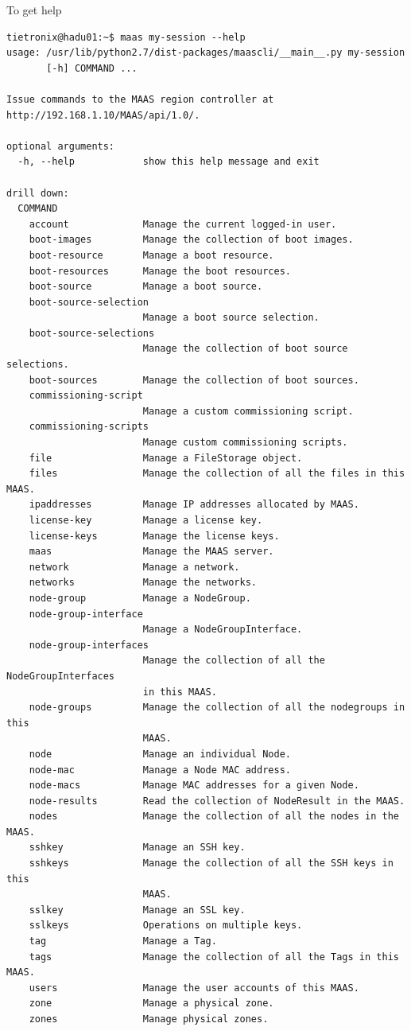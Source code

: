 To get help
{\tiny
\begin{verbatim}
tietronix@hadu01:~$ maas my-session --help
usage: /usr/lib/python2.7/dist-packages/maascli/__main__.py my-session
       [-h] COMMAND ...

Issue commands to the MAAS region controller at http://192.168.1.10/MAAS/api/1.0/.

optional arguments:
  -h, --help            show this help message and exit

drill down:
  COMMAND
    account             Manage the current logged-in user.
    boot-images         Manage the collection of boot images.
    boot-resource       Manage a boot resource.
    boot-resources      Manage the boot resources.
    boot-source         Manage a boot source.
    boot-source-selection
                        Manage a boot source selection.
    boot-source-selections
                        Manage the collection of boot source selections.
    boot-sources        Manage the collection of boot sources.
    commissioning-script
                        Manage a custom commissioning script.
    commissioning-scripts
                        Manage custom commissioning scripts.
    file                Manage a FileStorage object.
    files               Manage the collection of all the files in this MAAS.
    ipaddresses         Manage IP addresses allocated by MAAS.
    license-key         Manage a license key.
    license-keys        Manage the license keys.
    maas                Manage the MAAS server.
    network             Manage a network.
    networks            Manage the networks.
    node-group          Manage a NodeGroup.
    node-group-interface
                        Manage a NodeGroupInterface.
    node-group-interfaces
                        Manage the collection of all the NodeGroupInterfaces
                        in this MAAS.
    node-groups         Manage the collection of all the nodegroups in this
                        MAAS.
    node                Manage an individual Node.
    node-mac            Manage a Node MAC address.
    node-macs           Manage MAC addresses for a given Node.
    node-results        Read the collection of NodeResult in the MAAS.
    nodes               Manage the collection of all the nodes in the MAAS.
    sshkey              Manage an SSH key.
    sshkeys             Manage the collection of all the SSH keys in this
                        MAAS.
    sslkey              Manage an SSL key.
    sslkeys             Operations on multiple keys.
    tag                 Manage a Tag.
    tags                Manage the collection of all the Tags in this MAAS.
    users               Manage the user accounts of this MAAS.
    zone                Manage a physical zone.
    zones               Manage physical zones.


\end{verbatim}}
